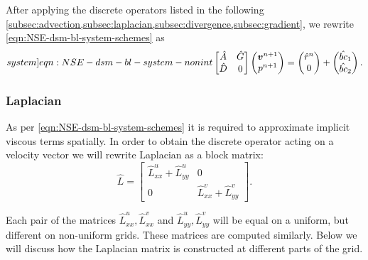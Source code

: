\documentclass{article}
\begin{document}
After applying the discrete operators listed in the following \cref{subsec:advection,subsec:laplacian,subsec:divergence,subsec:gradient}, we rewrite \cref{eqn:NSE-dsm-bl-system-schemes}  as
\begin{equation}\label[system]{eqn:NSE-dsm-bl-system-nonint}
	\begin{bmatrix}
		\hat{A} & \hat{G} \\
		\hat{D} & 0
	\end{bmatrix}
	\begin{pmatrix}
		\boldsymbol{v}^{n+1} \\ 
		p^{n+1}
	\end{pmatrix}
	=
	\begin{pmatrix}
		\hat{r}^n \\
		0
	\end{pmatrix}
	+
	\begin{pmatrix}
		\hat{bc}_1\\
		\hat{bc}_2
	\end{pmatrix}. 
\end{equation}


\subsubsection{Laplacian}\label{subsec:laplacian}

As per \cref{eqn:NSE-dsm-bl-system-schemes} it is required to approximate implicit viscous terms spatially. In order to obtain the discrete operator acting on a velocity vector we will rewrite Laplacian as a block matrix:
\begin{equation*}
	\hat L=
	\begin{bmatrix}
  \hat{L}^u_{xx}+\hat{L}^u_{yy} & 0 \\
  0 & \hat{L}^v_{xx}+\hat{L}^v_{yy}
\end{bmatrix}.
\end{equation*}

Each pair of the matrices $\hat{L}^u_{xx},\hat{L}^v_{xx}$ and $\hat{L}^u_{yy},\hat{L}^v_{yy}$ will be equal on a uniform, but different on non-uniform grids. These matrices are computed similarly. Below we will discuss how the Laplacian matrix is constructed at different parts of the grid.
\end{document}
